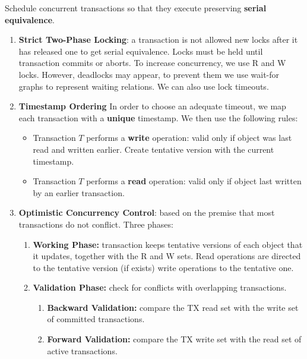 Schedule concurrent transactions so that they execute preserving \textbf{serial equivalence}.
\begin{enumerate}
    \item \textbf{Strict Two-Phase Locking}: a transaction is not allowed new locks after it has released one to get serial equivalence.
        Locks must be held until transaction commits or aborts.
        To increase concurrency, we use R and W locks.
        However, deadlocks may appear, to prevent them we use wait-for graphs to represent waiting relations.
        We can also use lock timeouts.
    \item \textbf{Timestamp Ordering}
        In order to choose an adequate timeout, we map each transaction with a \textbf{unique} timestamp.
        We then use the following rules:
        \begin{itemize}
            \item Transaction $T$ performs a \textbf{write} operation: valid only if object was last read and written earlier.
                Create tentative version with the current timestamp.
            \item Transaction $T$ performs a \textbf{read} operation: valid only if object last written by an earlier transaction.
        \end{itemize}
    \item \textbf{Optimistic Concurrency Control}: based on the premise that most transactions do not conflict.
        Three phases:
        \begin{enumerate}
            \item \textbf{Working Phase:} transaction keeps tentative versions of each object that it updates, together with the R and W sets.
                Read operations are directed to the tentative version (if exists) write operations to the tentative one.
            \item \textbf{Validation Phase:} check for conflicts with overlapping transactions.
            \begin{enumerate}
                \item \textbf{Backward Validation:} compare the TX read set with the write set of committed transactions.
                \item \textbf{Forward Validation:} compare the TX write set with the read set of active transactions.
            \end{enumerate}
        \end{enumerate}
\end{enumerate}
